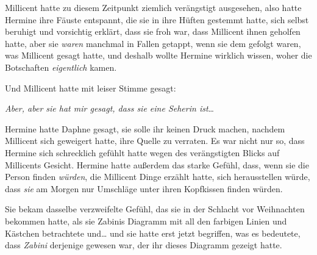 Millicent hatte zu diesem Zeitpunkt ziemlich verängstigt ausgesehen, also hatte Hermine ihre Fäuste entspannt, die sie in ihre Hüften gestemmt hatte, sich selbst beruhigt und vorsichtig erklärt, dass sie froh war, dass Millicent ihnen geholfen hatte, aber sie \emph{waren} manchmal in Fallen getappt, wenn sie dem gefolgt waren, was Millicent gesagt hatte, und deshalb wollte Hermine wirklich wissen, woher die Botschaften \emph{eigentlich} kamen.

Und Millicent hatte mit leiser Stimme gesagt:

\emph{Aber, aber sie hat \emph{mir} gesagt, dass sie eine Seherin ist}…

Hermine hatte Daphne gesagt, sie solle ihr keinen Druck machen, nachdem Millicent sich geweigert hatte, ihre Quelle zu verraten. Es war nicht nur so, dass Hermine sich schrecklich gefühlt hatte wegen des verängstigten Blicks auf Millicents Gesicht. Hermine hatte außerdem das starke Gefühl, dass, wenn sie die Person finden \emph{würden}, die Millicent Dinge erzählt hatte, sich herausstellen würde, dass \emph{sie} am Morgen nur Umschläge unter ihren Kopfkissen finden würden.

Sie bekam dasselbe verzweifelte Gefühl, das sie in der Schlacht vor Weihnachten bekommen hatte, als sie Zabinis Diagramm mit all den farbigen Linien und Kästchen betrachtete und… und sie hatte erst jetzt begriffen, was es bedeutete, dass \emph{Zabini} derjenige gewesen war, der ihr dieses Diagramm gezeigt hatte.

